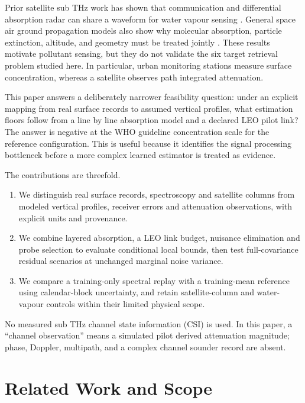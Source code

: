 \documentclass[conference]{IEEEtran}
\begin{document}
Prior satellite sub THz work has shown that communication and differential absorption radar can share a waveform for water vapour sensing \cite{aliaga2024dar}. General space air ground propagation models also show why molecular absorption, particle extinction, altitude, and geometry must be treated jointly \cite{yang2024attenuation}. These results motivate pollutant sensing, but they do not validate the six target retrieval problem studied here. In particular, urban monitoring stations measure surface concentration, whereas a satellite observes path integrated attenuation.

This paper answers a deliberately narrower feasibility question: under an explicit mapping from real surface records to assumed vertical profiles, what estimation floors follow from a line by line absorption model and a declared LEO pilot link? The answer is negative at the WHO guideline concentration scale for the reference configuration. This is useful because it identifies the signal processing bottleneck before a more complex learned estimator is treated as evidence.

The contributions are threefold.

\begin{enumerate}
\item We distinguish real surface records, spectroscopy and satellite columns from modeled vertical profiles, receiver errors and attenuation observations, with explicit units and provenance.
\item We combine layered absorption, a LEO link budget, nuisance elimination and probe selection to evaluate conditional local bounds, then test full-covariance residual scenarios at unchanged marginal noise variance.
\item We compare a training-only spectral replay with a training-mean reference using calendar-block uncertainty, and retain satellite-column and water-vapour controls within their limited physical scope.
\end{enumerate}

No measured sub THz channel state information (CSI) is used. In this paper, a ``channel observation'' means a simulated pilot derived attenuation magnitude; phase, Doppler, multipath, and a complex channel sounder record are absent.

\section{Related Work and Scope}
\end{document}
